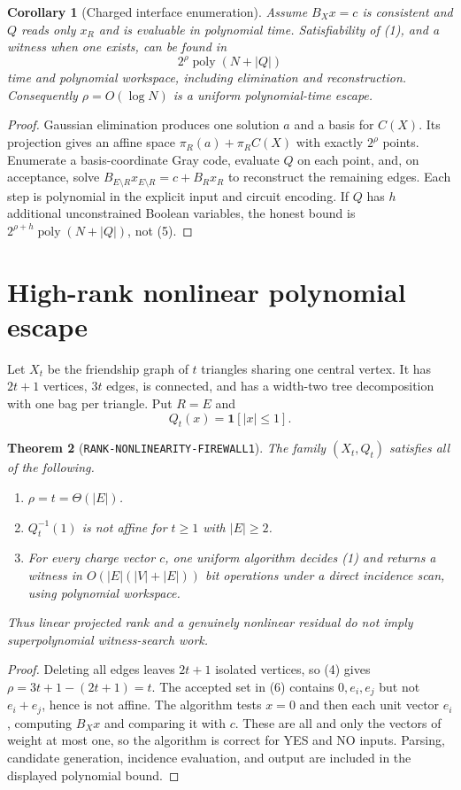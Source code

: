 \documentclass[11pt]{article}
\newtheorem{theorem}{Theorem}
\newtheorem{corollary}[theorem]{Corollary}
\begin{document}
\begin{corollary}[Charged interface enumeration]
Assume $B_Xx=c$ is consistent and $Q$ reads only $x_R$ and is evaluable in
polynomial time.  Satisfiability of (1), and a witness when one exists, can be
found in
\[
 2^\rho\operatorname{poly}(N+|Q|)                          \tag{5}
\]
time and polynomial workspace, including elimination and reconstruction.
Consequently $\rho=O(\log N)$ is a uniform polynomial-time escape.
\end{corollary}
\begin{proof}
Gaussian elimination produces one solution $a$ and a basis for $C(X)$.  Its
projection gives an affine space $\pi_R(a)+\pi_R C(X)$ with exactly $2^\rho$
points.  Enumerate a basis-coordinate Gray code, evaluate $Q$ on each point,
and, on acceptance, solve
$B_{E\setminus R}x_{E\setminus R}=c+B_Rx_R$ to reconstruct the remaining
edges.  Each step is polynomial in the explicit input and circuit encoding.
If $Q$ has $h$ additional unconstrained Boolean variables, the honest bound is
$2^{\rho+h}\operatorname{poly}(N+|Q|)$, not (5).
\end{proof}

\section{High-rank nonlinear polynomial escape}
Let $X_t$ be the friendship graph of $t$ triangles sharing one central vertex.
It has $2t+1$ vertices, $3t$ edges, is connected, and has a width-two tree
decomposition with one bag per triangle.  Put $R=E$ and
\[
 Q_t(x)=\mathbf 1[|x|\le1].                               \tag{6}
\]

\begin{theorem}[\texttt{RANK-NONLINEARITY-FIREWALL1}]
The family $(X_t,Q_t)$ satisfies all of the following.
\begin{enumerate}
\item $\rho=t=\Theta(|E|)$.
\item $Q_t^{-1}(1)$ is not affine for $t\ge1$ with $|E|\ge2$.
\item For every charge vector $c$, one uniform algorithm decides (1) and
returns a witness in $O(|E|(|V|+|E|))$ bit operations under a direct incidence
scan, using polynomial workspace.
\end{enumerate}
Thus linear projected rank and a genuinely nonlinear residual do not imply
superpolynomial witness-search work.
\end{theorem}
\begin{proof}
Deleting all edges leaves $2t+1$ isolated vertices, so (4) gives
$\rho=3t+1-(2t+1)=t$.  The accepted set in (6) contains $0,e_i,e_j$ but not
$e_i+e_j$, hence is not affine.  The algorithm tests $x=0$ and then each unit
vector $e_i$, computing $B_Xx$ and comparing it with $c$.  These are all and
only the vectors of weight at most one, so the algorithm is correct for YES
and NO inputs.  Parsing, candidate generation, incidence evaluation, and
output are included in the displayed polynomial bound.
\end{proof}
\end{document}
